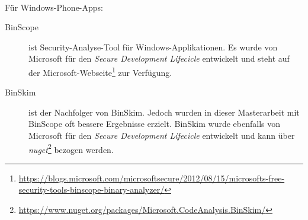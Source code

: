 $ $\\\\
Für Windows-Phone-Apps:
\begin{description}
	\item[BinScope ] ist Security-Analyse-Tool für Windows-Applikationen. Es wurde von Microsoft für den \textit{Secure Development Lifecicle} entwickelt und steht auf der Microsoft-Webseite\footnote{\url{https://blogs.microsoft.com/microsoftsecure/2012/08/15/microsofts-free-security-tools-binscope-binary-analyzer/}} zur Verfügung.
	\item[BinSkim ] ist der Nachfolger von BinSkim. Jedoch wurden in dieser Masterarbeit mit BinScope oft bessere Ergebnisse erzielt. BinSkim wurde ebenfalls von Microsoft für den \textit{Secure Development Lifecicle} entwickelt und kann über \textit{nuget}\footnote{\url{https://www.nuget.org/packages/Microsoft.CodeAnalysis.BinSkim/}} bezogen werden.
\end{description}

